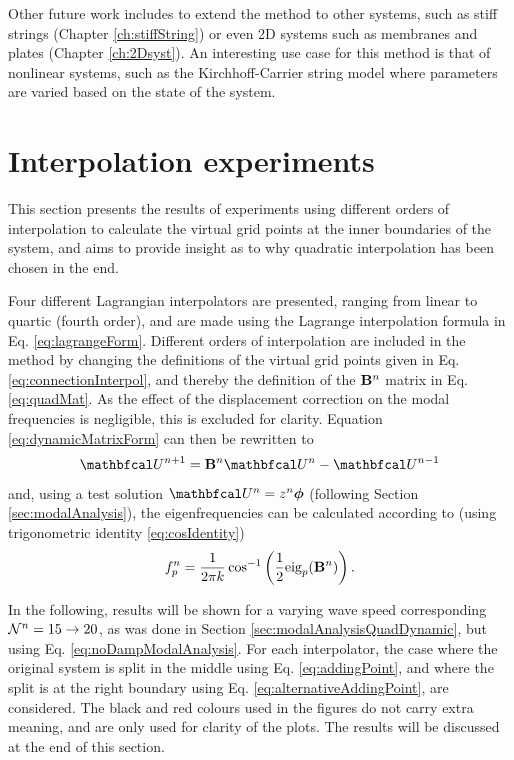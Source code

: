 Other future work includes to extend the method to other systems, such as stiff strings (Chapter \ref{ch:stiffString}) or even 2D systems such as membranes and plates (Chapter \ref{ch:2Dsyst}). An interesting use case for this method is that of nonlinear systems, such as the Kirchhoff-Carrier string model \cite{Carrier1945} where parameters are varied based on the state of the system. 

\section{Interpolation experiments}\label{sec:iterations}
This section presents the results of experiments using different orders of interpolation to calculate the virtual grid points at the inner boundaries of the system, and aims to provide insight as to why quadratic interpolation has been chosen in the end. 

Four different Lagrangian interpolators are presented, ranging from linear to quartic (fourth order), and are made using the Lagrange interpolation formula in Eq. \eqref{eq:lagrangeForm}. Different orders of interpolation are included in the method by changing the definitions of the virtual grid points given in Eq. \eqref{eq:connectionInterpol}, and thereby the definition of the $\mathbf{B}^n$ matrix in Eq. \eqref{eq:quadMat}. As the effect of the displacement correction on the modal frequencies is negligible, this is excluded for clarity. Equation \eqref{eq:dynamicMatrixForm} can then be rewritten to 
\begin{equation}
    \Ucal^{n+1} = \B^n \Ucal^n- \Ucal^{n-1}
\end{equation}
and, using a test solution $\Ucal^n = z^n\boldPhi$ (following Section \ref{sec:modalAnalysis}), the eigenfrequencies can be calculated according to (using trigonometric identity \eqref{eq:cosIdentity})
\begin{equation}\label{eq:noDampModalAnalysis}
    f_p^n = \frac{1}{2 \pi k}\cos^{-1}\left(\frac{1}{2}\text{eig}_p(\mathbf{B}^n)\right).
\end{equation}

In the following, results will be shown for a varying wave speed corresponding $\mathcal{N}^n = 15 \rightarrow 20$, as was done in Section \ref{sec:modalAnalysisQuadDynamic}, but using Eq. \eqref{eq:noDampModalAnalysis}. For each interpolator, the case where the original system is split in the middle using Eq. \eqref{eq:addingPoint}, and where the split is at the right boundary using Eq. \eqref{eq:alternativeAddingPoint}, are considered. The black and red colours used in the figures do not carry extra meaning, and are only used for clarity of the plots. The results will be discussed at the end of this section. 
 
